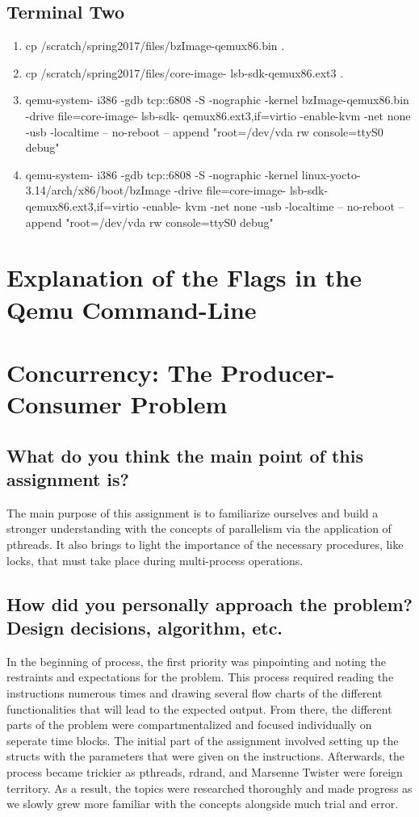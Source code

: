 \documentclass[letterpaper,10pt,draftclsnofoot,onecolumn]{IEEEtran}
\begin{document}
\subsection{Terminal Two}
\begin{enumerate}
\item cp /scratch/spring2017/files/bzImage-qemux86.bin .
\item cp /scratch/spring2017/files/core-image- lsb-sdk-qemux86.ext3 .
\item qemu-system- i386 -gdb tcp::6808 -S -nographic -kernel bzImage-qemux86.bin -drive file=core-image- lsb-sdk- qemux86.ext3,if=virtio -enable-kvm -net none -usb -localtime -- no-reboot -- append "root=/dev/vda rw console=ttyS0 debug"
\item qemu-system- i386 -gdb tcp::6808 -S -nographic -kernel linux-yocto- 3.14/arch/x86/boot/bzImage  -drive file=core-image- lsb-sdk- qemux86.ext3,if=virtio -enable- kvm -net none -usb -localtime -- no-reboot -- append "root=/dev/vda rw console=ttyS0 debug"
\end{enumerate}

\section{Explanation of the Flags in the Qemu Command-Line}


\section{Concurrency: The Producer-Consumer Problem}
\subsection{What do you think the main point of this assignment is?}
The main purpose of this assignment is to familiarize ourselves and build a stronger understanding with 
the concepts of parallelism via the application of pthreads. It also brings to light the importance of the 
necessary procedures, like locks, that must take place during multi-process operations.
\subsection{How did you personally approach the problem? Design decisions, algorithm, etc.}
In the beginning of process, the first priority was pinpointing and noting the restraints and expectations for the problem.
This process required reading the instructions numerous times and drawing several flow charts of the different functionalities that will
lead to the expected output. From there, the different parts of the problem were compartmentalized and focused individually on seperate time blocks.
The initial part of the assignment involved setting up the structs with the parameters that were given on the instructions. Afterwards,
the process became trickier as pthreads, rdrand, and Marsenne Twister were foreign territory. As a result, the topics were researched thoroughly
and made progress as we slowly grew more familiar with the concepts alongside much trial and error. 
\end{document}
